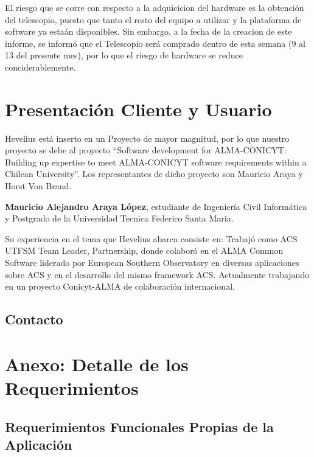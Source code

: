 \documentclass[letterpaper,spanish,10pt]{article}
\begin{document}
El riesgo que se corre con respecto a la adquicicion del hardware es la obtención del telescopio, puesto que tanto el resto del equipo a utilizar y la plataforma de software ya estaán disponibles.
Sin embargo, a la fecha de la creacion de este informe, se informó que el Telescopio será comprado dentro de esta semana (9 al 13 del presente mes), por lo que el riesgo de hardware se reduce conciderablemente.

\newpage


\section{Presentaci\'on Cliente y Usuario}
Hevelius está inserto en un Proyecto de mayor magnitud, por lo que nuestro proyecto se debe al proyecto ``Software development for ALMA-CONICYT: Building up expertise to meet ALMA-CONICYT software requirements within a Chilean University''. Los representantes de dicho proyecto son Mauricio Araya y Horst Von Brand.

{\bf Mauricio Alejandro Araya López}, estudiante de Ingeniería Civil Informática y Postgrado de la Universidad Tecnica Federico Santa Maria. 

Su experiencia en el tema que Hevelius abarca consiste en:
Trabajó como ACS UTFSM Team Leader, Partnership, donde colaboró en el ALMA Common Software
liderado por European Southern Observatory en diversas aplicaciones sobre ACS y en el desarrollo del mismo framework ACS. Actualmente trabajando en un proyecto Conicyt-ALMA de colaboración
internacional.





\subsection{Contacto}


\newpage


\section{Anexo: Detalle de los Requerimientos}

\subsection{Requerimientos Funcionales Propias de la Aplicaci\'on}
\end{document}
